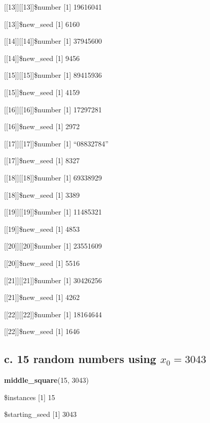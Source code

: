 \documentclass[]{article}
\newenvironment{Shaded}{\begin{snugshade}}{\end{snugshade}}
\newcommand{\KeywordTok}[1]{\textcolor[rgb]{0.13,0.29,0.53}{\textbf{{#1}}}}
\newcommand{\DecValTok}[1]{\textcolor[rgb]{0.00,0.00,0.81}{{#1}}}
\newcommand{\NormalTok}[1]{{#1}}
\begin{document}
{[}{[}13{]}{]}{[}{[}13{]}{]}\$number {[}1{]} 19616041

{[}{[}13{]}{]}\$new\_seed {[}1{]} 6160

{[}{[}14{]}{]}{[}{[}14{]}{]}\$number {[}1{]} 37945600

{[}{[}14{]}{]}\$new\_seed {[}1{]} 9456

{[}{[}15{]}{]}{[}{[}15{]}{]}\$number {[}1{]} 89415936

{[}{[}15{]}{]}\$new\_seed {[}1{]} 4159

{[}{[}16{]}{]}{[}{[}16{]}{]}\$number {[}1{]} 17297281

{[}{[}16{]}{]}\$new\_seed {[}1{]} 2972

{[}{[}17{]}{]}{[}{[}17{]}{]}\$number {[}1{]} ``08832784''

{[}{[}17{]}{]}\$new\_seed {[}1{]} 8327

{[}{[}18{]}{]}{[}{[}18{]}{]}\$number {[}1{]} 69338929

{[}{[}18{]}{]}\$new\_seed {[}1{]} 3389

{[}{[}19{]}{]}{[}{[}19{]}{]}\$number {[}1{]} 11485321

{[}{[}19{]}{]}\$new\_seed {[}1{]} 4853

{[}{[}20{]}{]}{[}{[}20{]}{]}\$number {[}1{]} 23551609

{[}{[}20{]}{]}\$new\_seed {[}1{]} 5516

{[}{[}21{]}{]}{[}{[}21{]}{]}\$number {[}1{]} 30426256

{[}{[}21{]}{]}\$new\_seed {[}1{]} 4262

{[}{[}22{]}{]}{[}{[}22{]}{]}\$number {[}1{]} 18164644

{[}{[}22{]}{]}\$new\_seed {[}1{]} 1646

\subsection{\texorpdfstring{c. 15 random numbers using
\(x_0 = 3043\)}{c. 15 random numbers using x\_0 = 3043}}\label{c.-15-random-numbers-using-x_0-3043}

\begin{Shaded}
\begin{Highlighting}[]
\KeywordTok{middle_square}\NormalTok{(}\DecValTok{15}\NormalTok{, }\DecValTok{3043}\NormalTok{)}
\end{Highlighting}
\end{Shaded}

\$instances {[}1{]} 15

\$starting\_seed {[}1{]} 3043
\end{document}
